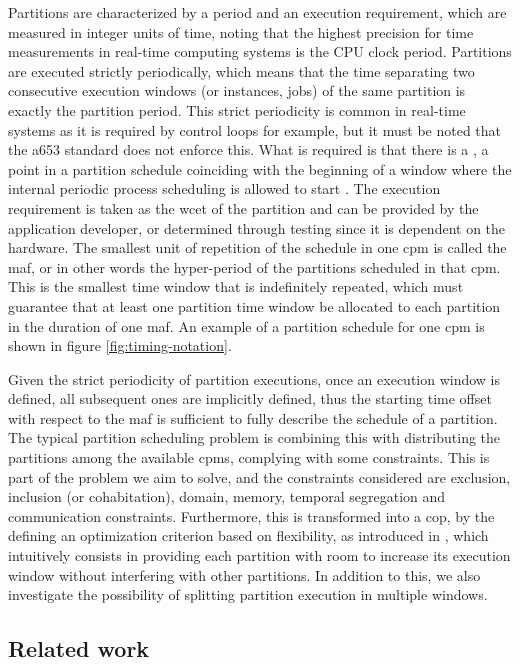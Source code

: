 \documentclass[main.tex]{subfiles}
\begin{document}
Partitions are characterized by a period and an execution requirement, which are measured in integer units of time, noting that the highest precision for time measurements in real-time computing systems is the CPU clock period.
Partitions are executed strictly periodically, which means that the time separating two consecutive execution windows (or instances, jobs) of the same partition is exactly the partition period.
This strict periodicity is common in real-time systems as it is required by control loops for example, but it must be noted that the \gls{a653} standard does not enforce this. 
What is required is that there is a , a point in a partition schedule coinciding with the beginning of a window where the internal periodic process scheduling is allowed to start \cite{arinc653}.
The execution requirement is taken as the \gls{wcet} of the partition and can be provided by the application developer, or determined through testing since it is dependent on the hardware.
The smallest unit of repetition of the schedule in one \gls{cpm} is called the \gls{maf}, or in other words the hyper-period of the partitions scheduled in that \gls{cpm}.
This is the smallest time window that is indefinitely repeated, which must guarantee that at least one partition time window be allocated to each partition in the duration of one \gls{maf}. 
An example of a partition schedule for one \gls{cpm} is shown in figure \ref{fig:timing-notation}.

Given the strict periodicity of partition executions, once an execution window is defined, all subsequent ones are implicitly defined, thus the starting time offset with respect to the \gls{maf} is sufficient to fully describe the schedule of a partition.
The typical partition scheduling problem is combining this with distributing the partitions among the available \glspl{cpm}, complying with some constraints.
This is part of the problem we aim to solve, and the constraints considered are exclusion, inclusion (or cohabitation), domain, memory, temporal segregation and communication constraints.
Furthermore, this is transformed into a \gls{cop}, by the defining an optimization criterion based on flexibility, as introduced in \cite{al2010partition}, which intuitively consists in providing each partition with room to increase its execution window without interfering with other partitions.
In addition to this, we also investigate the possibility of splitting partition execution in multiple windows.

\subsection{Related work}
\label{sec:related}
\end{document}
